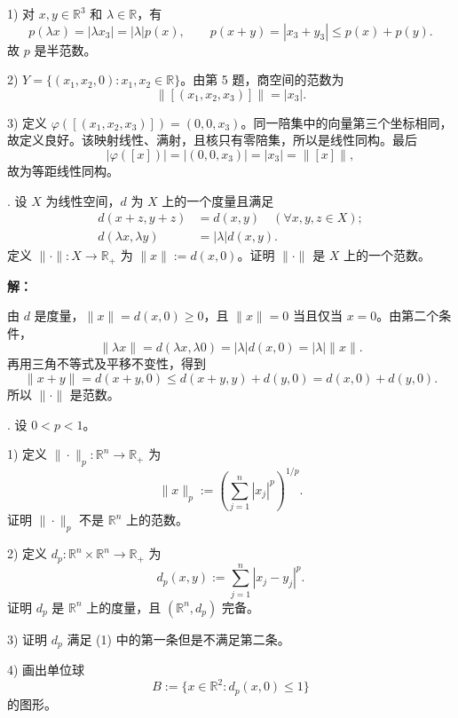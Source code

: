 \documentclass{article}
\begin{document}
1) 对 $x,y\in\mathbb R^3$ 和 $\lambda\in\mathbb R$，有
\[
p(\lambda x)=|\lambda x_3|=|\lambda|p(x),\qquad
p(x+y)=|x_3+y_3|\le p(x)+p(y).
\]
故 $p$ 是半范数。

2) $Y=\{(x_1,x_2,0):x_1,x_2\in\mathbb R\}$。由第 5 题，商空间的范数为
\[
\|[(x_1,x_2,x_3)]\|=|x_3|.
\]

3) 定义 $\varphi([(x_1,x_2,x_3)])=(0,0,x_3)$。同一陪集中的向量第三个坐标相同，故定义良好。该映射线性、满射，且核只有零陪集，所以是线性同构。最后
\[
|\varphi([x])|=|(0,0,x_3)|=|x_3|=\|[x]\|,
\]
故为等距线性同构。

\par\medskip

\par\medskip{}. 设 $X$ 为线性空间，$d$ 为 $X$ 上的一个度量且满足
\begin{equation}
\begin{aligned}
d(x+z,y+z)&=d(x,y)\quad(\forall x,y,z\in X);\\
d(\lambda x,\lambda y)&=|\lambda|d(x,y).
\end{aligned}\tag{1}\label{eq:metric}
\end{equation}
定义 $\|\cdot\|:X\to\mathbb R_+$ 为 $\|x\|:=d(x,0)$。证明 $\|\cdot\|$ 是 $X$ 上的一个范数。


\par{}\noindent\textbf{解：}\par\nopagebreak[4]


由 $d$ 是度量，$\|x\|=d(x,0)\ge0$，且 $\|x\|=0$ 当且仅当 $x=0$。由第二个条件，
\[
\|\lambda x\|=d(\lambda x,\lambda0)=|\lambda|d(x,0)=|\lambda|\|x\|.
\]
再用三角不等式及平移不变性，得到
\[
\|x+y\|=d(x+y,0)\le d(x+y,y)+d(y,0)=d(x,0)+d(y,0).
\]
所以 $\|\cdot\|$ 是范数。



\par\medskip{}. 设 $0<p<1$。

1) 定义 $\|\cdot\|_p:\mathbb R^n\to\mathbb R_+$ 为
\[
\|x\|_p:=\left(\sum_{j=1}^n|x_j|^p\right)^{1/p}.
\]
证明 $\|\cdot\|_p$ 不是 $\mathbb R^n$ 上的范数。

2) 定义 $d_p:\mathbb R^n\times\mathbb R^n\to\mathbb R_+$ 为
\[
d_p(x,y):=\sum_{j=1}^n|x_j-y_j|^p.
\]
证明 $d_p$ 是 $\mathbb R^n$ 上的度量，且 $(\mathbb R^n,d_p)$ 完备。

3) 证明 $d_p$ 满足 (1) 中的第一条但是不满足第二条。

4) 画出单位球
\[
B:=\{x\in\mathbb R^2:d_p(x,0)\le1\}
\]
的图形。
\end{document}
